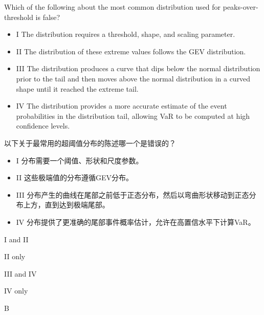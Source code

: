 \documentclass{article}
\newcounter{question} %
\begin{document}
\begin{question}
    Which of the following about the most common distribution used for peaks-over-threshold is false? 
    \begin{itemize}
    \item I The distribution requires a threshold, shape, and scaling parameter.
    
    \item II The distribution of these extreme values follows the GEV distribution. 
    
    \item III The distribution produces a curve that dips below the normal distribution prior to the tail and then moves above the normal distribution in a curved shape until it reached the extreme tail. 
    
    \item IV The distribution provides a more accurate estimate of the event probabilities in the distribution tail, allowing VaR to be computed at high confidence levels.
    \end{itemize}
    以下关于最常用的超阈值分布的陈述哪一个是错误的？
    \begin{itemize}
    \item I 分布需要一个阈值、形状和尺度参数。
    \item II 这些极端值的分布遵循GEV分布。
    \item III 分布产生的曲线在尾部之前低于正态分布，然后以弯曲形状移动到正态分布上方，直到达到极端尾部。
    \item IV 分布提供了更准确的尾部事件概率估计，允许在高置信水平下计算VaR。
    \end{itemize}
\end{question}

\begin{choices}
    \item I and II
    \item II only
    \item III and IV
    \item IV only
\end{choices}

\begin{correctanswer}
    B
\end{correctanswer}
\end{document}
